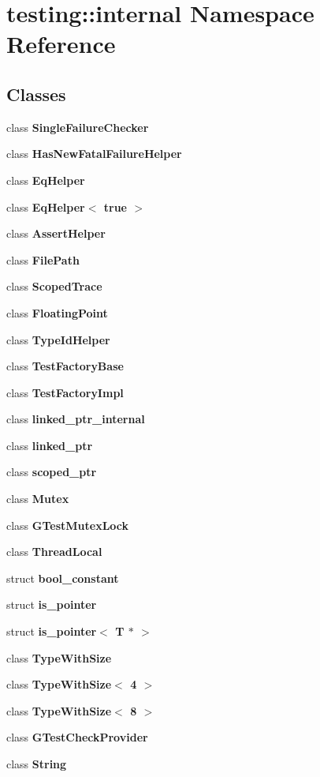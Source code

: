\section{testing::internal Namespace Reference}
\label{namespacetesting_1_1internal}


\subsection*{Classes}
\begin{CompactItemize}
\item 
class {\bf SingleFailureChecker}
\item 
class {\bf HasNewFatalFailureHelper}
\item 
class {\bf EqHelper}
\item 
class {\bf EqHelper$<$ true $>$}
\item 
class {\bf AssertHelper}
\item 
class {\bf FilePath}
\item 
class {\bf ScopedTrace}
\item 
class {\bf FloatingPoint}
\item 
class {\bf TypeIdHelper}
\item 
class {\bf TestFactoryBase}
\item 
class {\bf TestFactoryImpl}
\item 
class {\bf linked\_\-ptr\_\-internal}
\item 
class {\bf linked\_\-ptr}
\item 
class {\bf scoped\_\-ptr}
\item 
class {\bf Mutex}
\item 
class {\bf GTestMutexLock}
\item 
class {\bf ThreadLocal}
\item 
struct {\bf bool\_\-constant}
\item 
struct {\bf is\_\-pointer}
\item 
struct {\bf is\_\-pointer$<$ T $\ast$ $>$}
\item 
class {\bf TypeWithSize}
\item 
class {\bf TypeWithSize$<$ 4 $>$}
\item 
class {\bf TypeWithSize$<$ 8 $>$}
\item 
class {\bf GTestCheckProvider}
\item 
class {\bf String}
\end{CompactItemize}
